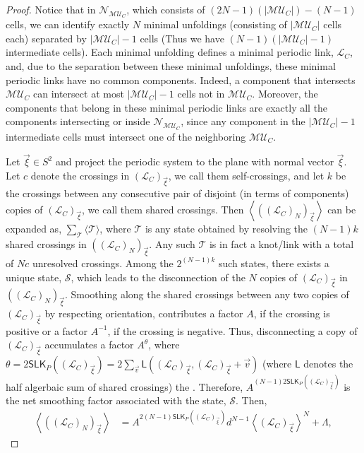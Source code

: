 \documentclass{article}
\begin{document}
\begin{proof}
Notice that in $\mathcal{N}_{\mathcal{MU}_C}$, which consists of $(2N-1)( |\mathcal{MU}_C|) - (N-1)$ cells, we can identify exactly $N$ minimal unfoldings (consisting of $|\mathcal{MU}_C|$ cells each) separated by $|\mathcal{MU}_C|-1$ cells (Thus we have $(N-1)(|\mathcal{MU}_C|-1)$ intermediate cells). Each minimal unfolding defines a minimal periodic link, $\displaystyle \mathcal{L}_C$, and, due to the separation between these minimal unfoldings, these minimal periodic links have no common components. Indeed, a component that intersects $\mathcal{MU}_C$ can intersect at most $|\mathcal{MU}_C|-1$ cells not in $\mathcal{MU}_C$. Moreover, the components that belong in these minimal periodic links are exactly all the components intersecting or inside $\mathcal{N}_{\mathcal{MU}_C}$, since any component in the $|\mathcal{MU}_C|-1$ intermediate cells must intersect one of the neighboring $\mathcal{MU}_C$.

Let $\vec{\xi}\in S^2$ and project the periodic system to the plane with normal vector $\vec{\xi}$. Let $c$ denote the crossings in ${(\mathcal{L}_C)}_{\vec{\xi}}$, we call them self-crossings, and let $k$ be the crossings between any consecutive pair of disjoint (in terms of components) copies of $\displaystyle {(\mathcal{L}_C)}_{\vec{\xi}}$, we call them shared crossings.  Then
 $\displaystyle \left \langle {((\mathcal{L}_C)_{N})}_{\vec{\xi}} \right \rangle$ can be expanded as, $\displaystyle \sum_{\mathcal{T}} \langle 
\mathcal{T} \rangle$, where $\mathcal{T}$ is any state obtained by resolving the $(N-1)k$ shared crossings in $\displaystyle {((\mathcal{L}_{C})_{N})}_{\vec{\xi}}$. Any such $\mathcal{T}$ is in fact a knot/link with a total of $\displaystyle Nc$ unresolved crossings.  Among the $2^{(N-1)k}$ such states, there exists a unique state, $\mathcal{S}$, which leads to the disconnection of  the $N$ copies of ${(\mathcal{L}_C)}_{\vec{\xi}}$ in  $\displaystyle {((\mathcal{L}_C)_{N})}_{\vec{\xi}}$. Smoothing along the shared crossings between any two copies of ${(\mathcal{L}_C)}_{\vec{\xi}}$ by respecting orientation, contributes a factor $A$, if the crossing is positive or a factor $A^{-1}$, if the crossing is negative. Thus, disconnecting a copy of  ${(\mathcal{L}_C)}_{\vec{\xi}}$ accumulates a factor $A^\theta$, where $\theta= 2\mathsf{SLK}_P({(\mathcal{L}_C)}_{\vec{\xi}})= 2\sum_{\vec{v}} \mathsf{L}({(\mathcal{L}_C)}_{\vec{\xi}}, {(\mathcal{L}_C)}_{\vec{\xi}} + \vec{v})$ (where $\mathsf{L}$ denotes the half algerbaic sum of shared crossings) the . Therefore, $A^{(N-1)2\mathsf{SLK}_P({(\mathcal{L}_C)}_{\vec{\xi}})}$ is the net smoothing factor associated with the state, $\mathcal{S}$. Then,
\begin{equation}
    \begin{split}\displaystyle
        \left\langle {((\mathcal{L}_C)_{N})}_{\vec{\xi}} \right\rangle  &= A^{2(N-1)\mathsf{SLK}_P({(\mathcal{L}_C)}_{\vec{\xi}})} d^{N-1} \left\langle {(\mathcal{L}_C)}_{\vec{\xi}} \right\rangle^N + \Lambda,
    \end{split}
    \label{eq-theta-lam}
\end{equation}


\end{proof}
\end{document}
